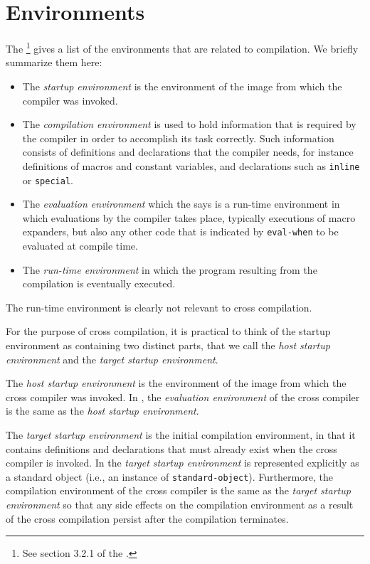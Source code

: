 \section{Environments}

The \hs{}\footnote{See section 3.2.1 of the \hs{}.} gives a list of
the environments that are related to compilation.  We briefly
summarize them here:

\begin{itemize}
\item The \emph{startup environment} is the environment of the image
  from which the compiler was invoked.
\item The \emph{compilation environment} is used to hold information
  that is required by the compiler in order to accomplish its task
  correctly.  Such information consists of definitions and
  declarations that the compiler needs, for instance definitions of
  macros and constant variables,  and declarations such as
  \texttt{inline} or \texttt{special}. 
\item The \emph{evaluation environment} which the \hs{} says is a
  run-time environment in which evaluations by the compiler takes
  place, typically executions of macro expanders, but also any other
  code that is indicated by \texttt{eval-when} to be evaluated at
  compile time.
\item The \emph{run-time environment} in which the program resulting
  from the compilation is eventually executed.
\end{itemize}

The run-time environment is clearly not relevant to cross
compilation. 

For the purpose of cross compilation, it is practical to think of the
startup environment as containing two distinct parts, that we call the
\emph{host startup environment} and the \emph{target startup
  environment}.

The \emph{host startup environment} is the environment of the image
from which the cross compiler was invoked.  In \sysname{}, the
\emph{evaluation environment} of the cross compiler is the same as the
\emph{host startup environment}.

The \emph{target startup environment} is the initial compilation
environment, in that it contains definitions and declarations that
must already exist when the cross compiler is invoked.  In \sysname{}
the \emph{target startup environment} is represented explicitly as a
standard object (i.e., an instance of \texttt{standard-object}).
Furthermore, the compilation environment of the cross compiler is the
same as the \emph{target startup environment} so that any side effects
on the compilation environment as a result of the cross compilation
persist after the compilation terminates.  

